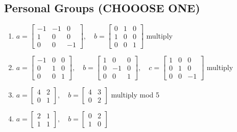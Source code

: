 \subsection{Personal Groups (CHOOOSE ONE)}
\begin{enumerate}
    \setlength{\itemsep}{5pt} %
    \item[\#1)] $ a = \begin{bmatrix} -1 & -1 & 0 \\ 1 & 0 & 0 \\ 0 & 0 & -1 \end{bmatrix}, \quad
                 b = \begin{bmatrix} 0 & 1 & 0 \\ 1 & 0 & 0 \\ 0 & 0 & 1 \end{bmatrix} $
                 \quad multiply
    \item[\#2)] $ a = \begin{bmatrix} -1 & 0 & 0 \\ 0 & 1 & 0 \\ 0 & 0 & 1 \end{bmatrix}, \quad
                 b = \begin{bmatrix} 1 & 0 & 0 \\ 0 & -1 & 0 \\ 0 & 0 & 1 \end{bmatrix}, \quad
                 c = \begin{bmatrix} 1 & 0 & 0 \\ 0 & 1 & 0 \\ 0 & 0 & -1 \end{bmatrix} $
                 \quad multiply
    \item[\#3)] $ a = \begin{bmatrix} 4 & 2 \\ 0 & 1 \end{bmatrix}, \quad
                 b = \begin{bmatrix} 4 & 3 \\ 0 & 2 \end{bmatrix} $
                 \quad multiply mod 5
    \item[\#4)] $ a = \begin{bmatrix} 2 & 1 \\ 1 & 1 \end{bmatrix}, \quad
                 b = \begin{bmatrix} 0 & 2 \\ 1 & 0 \end{bmatrix} $

\end{enumerate}
